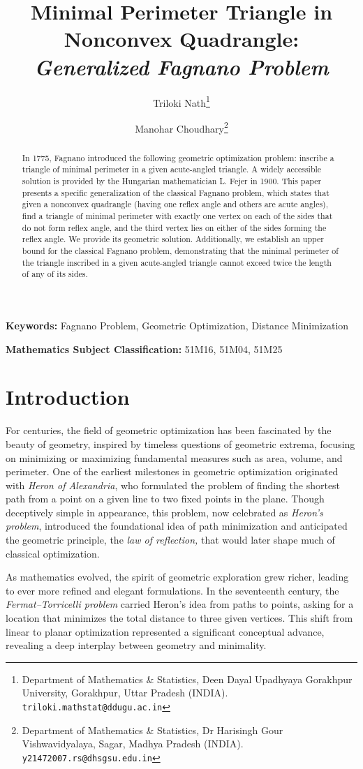 \documentclass[12pt,a4paper]{article}
\title{
	Minimal Perimeter Triangle in Nonconvex Quadrangle: \\
	\textit{Generalized Fagnano Problem}
}
\author{
	Triloki Nath\thanks{
		Department of Mathematics \& Statistics, Deen Dayal Upadhyaya Gorakhpur University, Gorakhpur, Uttar Pradesh (INDIA). \texttt{triloki.mathstat@ddugu.ac.in}
	}
	\and 
	Manohar Choudhary\thanks{
		Department of Mathematics \& Statistics, Dr Harisingh Gour Vishwavidyalaya, Sagar, Madhya Pradesh (INDIA). \texttt{y21472007.rs@dhsgsu.edu.in}
	}
}
\date{}
\theoremstyle{definition}
\theoremstyle{remark}
\begin{document}
	
	\maketitle
	
	\begin{abstract}
		In 1775, Fagnano introduced the following geometric optimization problem: inscribe a triangle of minimal perimeter in a given acute-angled triangle.	
		A widely accessible solution is provided by the Hungarian mathematician L. Fejer in 1900.
		This paper presents a specific generalization of the classical Fagnano problem, which states that given a nonconvex quadrangle (having one reflex angle and others are acute angles), find a triangle of minimal perimeter with exactly one vertex on each of the sides that do not form reflex angle, and the third vertex lies on either of the sides forming the reflex angle. We provide its geometric solution. Additionally, we establish an upper bound for the classical Fagnano problem, demonstrating that the minimal perimeter of the triangle inscribed in a given acute-angled triangle cannot exceed twice the length of any of its sides.
	\end{abstract}


\textbf{Keywords:} Fagnano Problem, Geometric Optimization, Distance Minimization
 
 \textbf{Mathematics Subject Classification:} 51M16, 51M04, 51M25


\section{Introduction}

For centuries, the field of geometric optimization has been fascinated by the beauty of geometry, inspired by timeless questions of geometric extrema, focusing on minimizing or maximizing fundamental measures such as area, volume, and perimeter. One of the earliest milestones in geometric optimization originated with \textit{Heron of Alexandria}, who formulated the problem of finding the shortest path from a point on a given line to two fixed points in the plane. Though deceptively simple in appearance, this problem, now celebrated as \textit{Heron’s problem}, introduced the foundational idea of path minimization and anticipated the geometric principle, the \textit{law of reflection,} that would later shape much of classical optimization.

As mathematics evolved, the spirit of geometric exploration grew richer, leading to ever more refined and elegant formulations. In the seventeenth century, the \textit{Fermat–Torricelli problem} carried Heron’s idea from paths to points, asking for a location that minimizes the total distance to three given vertices. This shift from linear to planar optimization represented a significant conceptual advance, revealing a deep interplay between geometry and minimality.
\end{document}
